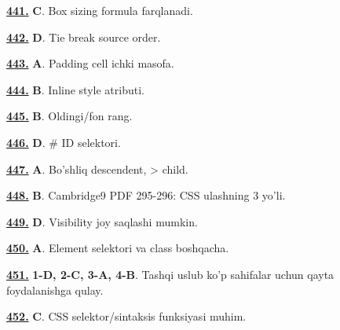 \documentclass[10pt,a4paper,oneside]{article}
\begin{document}
\par\vspace{3mm}
\noindent\hyperlink{q441}{\textbf{441.}} \textbf{C}.  Box sizing formula farqlanadi.
\par\vspace{3mm}
\noindent\hyperlink{q442}{\textbf{442.}} \textbf{D}.  Tie break source order.
\par\vspace{3mm}
\noindent\hyperlink{q443}{\textbf{443.}} \textbf{A}.  Padding cell ichki masofa.
\par\vspace{3mm}
\noindent\hyperlink{q444}{\textbf{444.}} \textbf{B}.  Inline style atributi.
\par\vspace{3mm}
\noindent\hyperlink{q445}{\textbf{445.}} \textbf{B}.  Oldingi/fon rang.
\par\vspace{3mm}
\noindent\hyperlink{q446}{\textbf{446.}} \textbf{D}.  \# ID selektori.
\par\vspace{3mm}
\noindent\hyperlink{q447}{\textbf{447.}} \textbf{A}.  Bo'shliq descendent, \textgreater{} child.
\par\vspace{3mm}
\noindent\hyperlink{q448}{\textbf{448.}} \textbf{B}.  Cambridge9 PDF 295-296: CSS ulashning 3 yo'li.
\par\vspace{3mm}
\noindent\hyperlink{q449}{\textbf{449.}} \textbf{D}.  Visibility joy saqlashi mumkin.
\par\vspace{3mm}
\noindent\hyperlink{q450}{\textbf{450.}} \textbf{A}.  Element selektori va class boshqacha.
\par\vspace{3mm}
\noindent\hyperlink{q451}{\textbf{451.}} \textbf{1-D, 2-C, 3-A, 4-B}.  Tashqi uslub ko'p sahifalar uchun qayta foydalanishga qulay.
\par\vspace{3mm}
\noindent\hyperlink{q452}{\textbf{452.}} \textbf{C}.  CSS selektor/sintaksis funksiyasi muhim.
\par\vspace{3mm}
\end{document}
